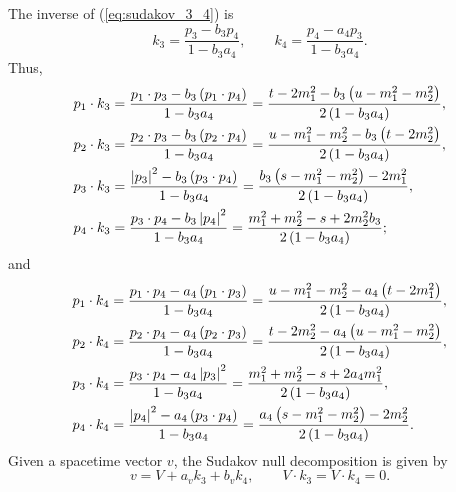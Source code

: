 The inverse of (\ref{eq:sudakov_3_4}) is
\begin{equation}
	k_{3} = \frac{p_{3} - b_{3} p_{4}}{1 - b_{3} a_{4}}, \qquad k_{4} = \frac{p_{4} - a_{4} p_{3}}{1 - b_{3} a_{4}}.
\end{equation}
Thus,
\begin{align}
	p_{1} \cdot k_{3} &= \frac{p_{1} \cdot p_{3} - b_{3} \left( p_{1} \cdot p_{4} \right)}{1 - b_{3} a_{4}} = \frac{ t - 2m_{1}^{2} - b_{3} \left( u - m_{1}^{2} - m_{2}^{2} \right) }{2 \left(1 - b_{3} a_{4} \right)}, \\
	p_{2} \cdot k_{3} &= \frac{p_{2} \cdot p_{3} - b_{3} \left( p_{2} \cdot p_{4} \right)}{1 - b_{3} a_{4}} = \frac{ u - m_{1}^{2} - m_{2}^{2} - b_{3} \left( t - 2m_{2}^{2} \right) }{2 \left(1 - b_{3} a_{4} \right)}, \\
	p_{3} \cdot k_{3} &= \frac{\left\lvert p_{3} \right\rvert^{2} - b_{3} \left( p_{3} \cdot p_{4} \right)}{1 - b_{3} a_{4}} = \frac{ b_{3} \left( s - m_{1}^{2} - m_{2}^{2} \right) - 2m_{1}^{2} }{2 \left(1 - b_{3} a_{4} \right)}, \\
	p_{4} \cdot k_{3} &= \frac{p_{3} \cdot p_{4} - b_{3} \left\lvert p_{4} \right\rvert^{2}}{1 - b_{3} a_{4}} = \frac{ m_{1}^{2} + m_{2}^{2} - s + 2 m_{2}^{2} b_{3}}{2 \left(1 - b_{3} a_{4} \right)};
\end{align}
and
\begin{align}
	p_{1} \cdot k_{4} &= \frac{p_{1} \cdot p_{4} - a_{4} \left( p_{1} \cdot p_{3} \right)}{1 - b_{3} a_{4}} = \frac{u - m_{1}^{2} - m_{2}^{2} - a_{4} \left(t - 2 m_{1}^{2} \right)}{2 \left( 1 - b_{3} a_{4} \right)}, \\
	p_{2} \cdot k_{4} &= \frac{p_{2} \cdot p_{4} - a_{4} \left( p_{2} \cdot p_{3} \right)}{1 - b_{3} a_{4}} = \frac{t - 2m_{2}^{2} - a_{4} \left( u - m_{1}^{2} - m_{2}^{2} \right)}{2 \left( 1 - b_{3} a_{4} \right)}, \\
	p_{3} \cdot k_{4} &= \frac{p_{3} \cdot p_{4} - a_{4} \left\lvert p_{3} \right\rvert^{2}}{1 - b_{3} a_{4}} = \frac{m_{1}^{2} + m_{2}^{2} - s + 2 a_{4} m_{1}^{2}}{2 \left( 1 - b_{3} a_{4} \right)}, \\
	p_{4} \cdot k_{4} &= \frac{ \left\lvert p_{4} \right\rvert^{2} - a_{4} \left( p_{3} \cdot p_{4} \right)}{1 - b_{3} a_{4}} = \frac{a_{4} \left( s - m_{1}^{2} - m_{2}^{2} \right) - 2 m_{2}^{2}}{2 \left( 1 - b_{3} a_{4} \right)}.
\end{align}
Given a spacetime vector $v$, the Sudakov null decomposition is given by
\begin{equation}
	v = V + a_{v} k_{3} + b_{v} k_{4}, \qquad V \cdot k_{3} = V \cdot k_{4} = 0.
\end{equation}
